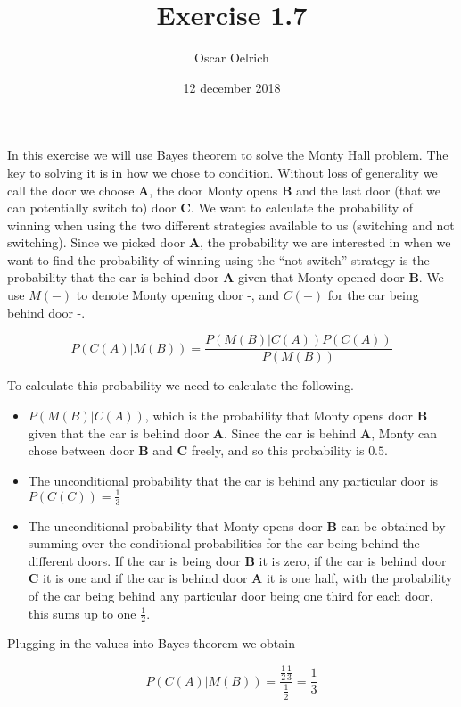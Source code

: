 \documentclass[]{article}
\title{Exercise 1.7}
\author{Oscar Oelrich}
\date{12 december 2018}
\providecommand{\tightlist}{%
  \setlength{\itemsep}{0pt}\setlength{\parskip}{0pt}}
\begin{document}
\maketitle

In this exercise we will use Bayes theorem to solve the Monty Hall
problem. The key to solving it is in how we chose to condition. Without
loss of generality we call the door we choose \textbf{A}, the door Monty
opens \textbf{B} and the last door (that we can potentially switch to)
door \textbf{C}. We want to calculate the probability of winning when
using the two different strategies available to us (switching and not
switching). Since we picked door \textbf{A}, the probability we are
interested in when we want to find the probability of winning using the
``not switch'' strategy is the probability that the car is behind door
\textbf{A} given that Monty opened door \textbf{B}. We use \(M(-)\) to
denote Monty opening door -, and \(C(-)\) for the car being behind door
-.

\[\begin{equation}
P(C(A)|M(B))=\frac{P(M(B)|C(A))P(C(A))}{P(M(B))}
\end{equation}\]

To calculate this probability we need to calculate the following.

\begin{itemize}
\tightlist
\item
  \(P(M(B)|C(A))\), which is the probability that Monty opens door
  \textbf{B} given that the car is behind door \textbf{A}. Since the car
  is behind \textbf{A}, Monty can chose between door \textbf{B} and
  \textbf{C} freely, and so this probability is \(0.5\).
\item
  The unconditional probability that the car is behind any particular
  door is \(P(C(C))=\frac{1}{3}\)
\item
  The unconditional probability that Monty opens door \textbf{B} can be
  obtained by summing over the conditional probabilities for the car
  being behind the different doors. If the car is being door \textbf{B}
  it is zero, if the car is behind door \textbf{C} it is one and if the
  car is behind door \textbf{A} it is one half, with the probability of
  the car being behind any particular door being one third for each
  door, this sums up to one \(\frac{1}{2}\).
\end{itemize}

Plugging in the values into Bayes theorem we obtain

\[\begin{equation}
P(C(A)|M(B))=\frac{\frac{1}{2}\frac{1}{3}}{\frac{1}{2}}=\frac{1}{3}
\end{equation}\]
\end{document}
